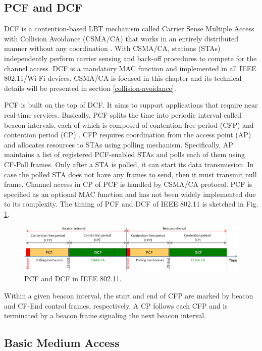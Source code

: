 \subsection{PCF and DCF}
\label{pcf-dcf}

DCF is a contention-based LBT mechanism called Carrier Sense Multiple Access with Collision Avoidance (CSMA/CA) that works in an entirely distributed manner without any coordination \cite{80211}. With CSMA/CA, stations (STAs) independently perform carrier sensing and back-off procedures to compete for the channel access. DCF is a mandatory MAC function and implemented in all IEEE 802.11/\mbox{Wi-Fi} devices. CSMA/CA is focused in this chapter and its technical details will be presented in section \ref{collision-avoidance}.

PCF is built on the top of DCF. It aims to support applications that require near real-time services. Basically, PCF splits the time into periodic interval called beacon intervals, each of which is composed of contention-free period (CFP) and contention period (CP) \cite{80211}. CFP requires coordination from the access point (AP) and allocates resources to STAs using polling mechanism. Specifically, AP maintains a list of registered PCF-enabled STAs and polls each of them using CF-Poll frames. Only after a STA is polled, it can start its data transmission. In case the polled STA does not have any frames to send, then it must transmit null frame. Channel access in CP of PCF is handled by CSMA/CA protocol. PCF is specified as an optional MAC function and has not been widely implemented due to its complexity. The timing of PCF and DCF of IEEE 802.11 is sketched in Fig. \ref{figs:802-11-PCF-DCF}. 
\begin{figure}[!ht]
	\centering
	\includegraphics[width=1.0\columnwidth]{figs/802-11-PCF-DCF}
	\caption{PCF and DCF in IEEE 802.11.}
	\label{figs:802-11-PCF-DCF}
\end{figure}
Within a given beacon interval, the start and end of CFP are marked by beacon and CF-End control frames, respectively. A CP follows each CFP and is terminated by a beacon frame signaling the next beacon interval. 

\subsection{Basic Medium Access}
\label{basic-medium-access}

